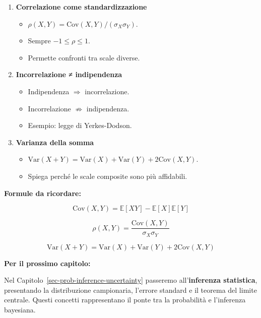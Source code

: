 \documentclass[
  italian,
  letterpaper,
  a4paper,
  11pt,
  open=any]{scrbook}
\providecommand{\tightlist}{%
  \setlength{\itemsep}{0pt}\setlength{\parskip}{0pt}}
\theoremstyle{plain}
\theoremstyle{definition}
\theoremstyle{definition}
\theoremstyle{remark}
\begin{document}
\begin{tcolorbox}
\begin{enumerate}
  \begin{itemize}
  \tightlist
  \item
    \(\text{Cov}(X,Y) = \mathbb{E}[XY] - \mathbb{E}[X]\mathbb{E}[Y]\).
  \end{itemize}
\item
  \textbf{Correlazione come standardizzazione}

  \begin{itemize}
  \tightlist
  \item
    \(\rho(X,Y) = \text{Cov}(X,Y)/(\sigma_X \sigma_Y)\).
  \item
    Sempre \(-1 \leq \rho \leq 1\).
  \item
    Permette confronti tra scale diverse.
  \end{itemize}
\item
  \textbf{Incorrelazione ≠ indipendenza}

  \begin{itemize}
  \tightlist
  \item
    Indipendenza \(\Rightarrow\) incorrelazione.
  \item
    Incorrelazione \(\not\Rightarrow\) indipendenza.
  \item
    Esempio: legge di Yerkes-Dodson.
  \end{itemize}
\item
  \textbf{Varianza della somma}

  \begin{itemize}
  \tightlist
  \item
    \(\text{Var}(X+Y) = \text{Var}(X) + \text{Var}(Y) + 2\text{Cov}(X,Y)\).
  \item
    Spiega perché le scale composite sono più affidabili.
  \end{itemize}
\end{enumerate}

\textbf{Formule da ricordare:}

\[
\text{Cov}(X,Y) = \mathbb{E}[XY] - \mathbb{E}[X]\mathbb{E}[Y]
\]

\[
\rho(X,Y) = \frac{\text{Cov}(X,Y)}{\sigma_X \sigma_Y}
\]

\[
\text{Var}(X + Y) = \text{Var}(X) + \text{Var}(Y) + 2\text{Cov}(X,Y)
\]

\textbf{Per il prossimo capitolo:}

Nel Capitolo~\ref{sec-prob-inference-uncertainty} passeremo
all'\textbf{inferenza statistica}, presentando la distribuzione
campionaria, l'errore standard e il teorema del limite centrale. Questi
concetti rappresentano il ponte tra la probabilità e l'inferenza
bayesiana.

\end{tcolorbox}
\end{document}
